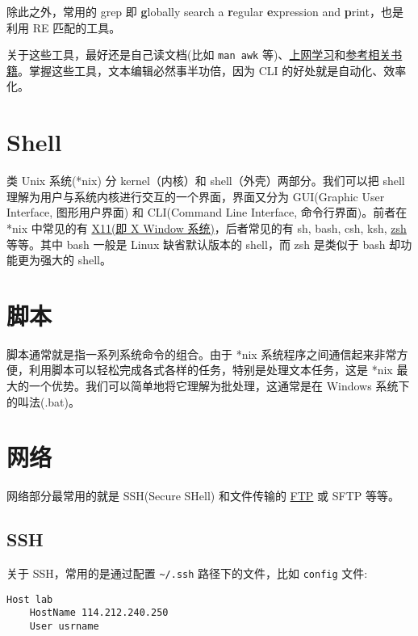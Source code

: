 \documentclass[a4paper,openany]{book}
\begin{document}
除此之外，常用的 grep 即 \textbf{g}lobally search a \textbf{r}egular \textbf{e}xpression and \textbf{p}rint，也是利用 RE 匹配的工具。

关于这些工具，最好还是自己读文档(比如 \texttt{man awk} 等)、\href{https://www.google.com.hk/search?client=safari\&rls=en\&q=awk\&ie=UTF-8\&oe=UTF-8}{上网学习}和\href{http://www.amazon.cn/s/\&url=search-alias\%3Daps\&field-keywords=awk}{参考相关书籍}。掌握这些工具，文本编辑必然事半功倍，因为 CLI 的好处就是自动化、效率化。

\section{Shell}

类 Unix 系统(*nix) 分 kernel（内核）和 shell（外壳）两部分。我们可以把 shell 理解为用户与系统内核进行交互的一个界面，界面又分为 GUI(Graphic User Interface, 图形用户界面) 和 CLI(Command Line Interface, 命令行界面)。前者在 *nix 中常见的有 \href{www.x.org}{X11(即 X Window 系统)}，后者常见的有 sh, bash, csh, ksh, \href{http://www.zsh.org}{zsh} 等等。其中 bash 一般是 Linux 缺省默认版本的 shell，而 zsh 是类似于 bash 却功能更为强大的 shell。

\section{脚本}

脚本通常就是指一系列系统命令的组合。由于 *nix 系统程序之间通信起来非常方便，利用脚本可以轻松完成各式各样的任务，特别是处理文本任务，这是 *nix 最大的一个优势。我们可以简单地将它理解为批处理，这通常是在 Windows 系统下的叫法(.bat)。

\section{网络}

网络部分最常用的就是 SSH(Secure SHell) 和文件传输的 \href{http://zh.wikipedia.org/wiki/Ftp}{FTP} 或 SFTP 等等。

\subsection{SSH}

关于 SSH，常用的是通过配置 \texttt{\textasciitilde{}/.ssh} 路径下的文件，比如 \texttt{config} 文件:

\begin{shaded}\begin{verbatim}
Host lab
    HostName 114.212.240.250
    User usrname
\end{verbatim}\end{shaded}
\end{document}
